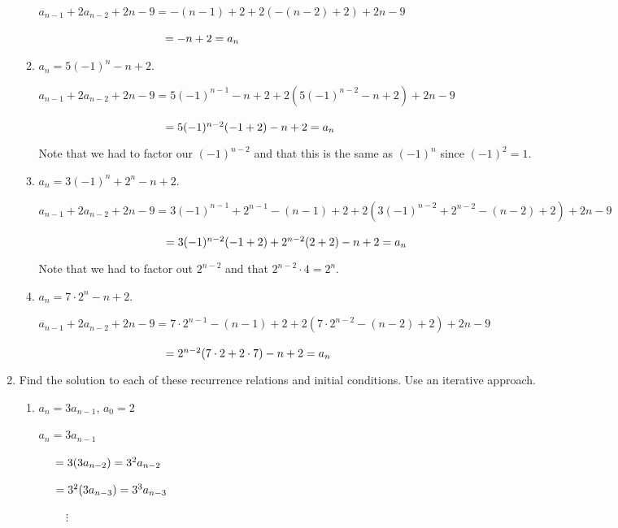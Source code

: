 \documentclass[11pt]{article}
\begin{document}
\begin{enumerate}[label=\textbf{\arabic*.}]
\begin{enumerate}[label=\textbf{\alph*)}]
		$a_{n - 1} + 2a_{n - 2} + 2n - 9 = -(n - 1) + 2 + 2(-(n - 2) + 2) + 2n - 9$
		
		$\hspace{3.9cm} = -n + 2 = a_n$
		
		\item $a_n = 5(-1)^n - n + 2$.
		
		$a_{n - 1} + 2a_{n - 2} + 2n - 9 = 5(-1)^{n - 1} - n + 2 + 2(5(-1)^{n - 2} - n + 2) + 2n - 9$
		
		$\hspace{3.9cm} = 5(-1)^{n - 2}(-1 + 2) - n + 2 = a_n$
		
		Note that we had to factor our $(-1)^{n - 2}$ and that this is the same as $(-1)^n$ since $(-1)^2 = 1$.
		
		\item $a_n = 3(-1)^n + 2^n - n + 2$.
		
		$a_{n - 1} + 2a_{n - 2} + 2n - 9 = 3(-1)^{n - 1} + 2^{n - 1} - (n - 1) + 2 + 2(3(-1)^{n - 2} + 2^{n - 2} - (n - 2) + 2) + 2n - 9$
		
		$\hspace{3.9cm} = 3(-1)^{n - 2}(-1 + 2) + 2^{n - 2}(2 + 2) - n + 2 = a_n$
		
		Note that we had to factor out $2^{n - 2}$ and that $2^{n - 2} \cdot 4 = 2^n$.
		
		\item $a_n = 7 \cdot 2^n - n + 2$.
		
		$a_{n - 1} + 2a_{n - 2} + 2n - 9 = 7 \cdot 2^{n - 1} - (n - 1) + 2 + 2(7 \cdot 2^{n - 2} - (n - 2) + 2) + 2n - 9$
		
		$\hspace{3.9cm} = 2^{n - 2}(7 \cdot 2 + 2 \cdot 7) - n + 2 = a_n$
	\end{enumerate}

	\item Find the solution to each of these recurrence relations and initial conditions. Use an iterative approach.
	
	\begin{enumerate}[label=\textbf{\alph*)}]
		\item $a_n = 3a_{n - 1}$, $a_0 = 2$
		
		$a_n = 3a_{n - 1}$
		
		$\hspace{0.5cm} = 3(3a_{n - 2}) = 3^2a_{n - 2}$
		
		$\hspace{0.5cm} = 3^2(3a_{n - 3}) = 3^3a_{n - 3}$
		
		$\hspace{1cm} \vdots$
		

\end{enumerate}
\end{enumerate}
\end{document}

